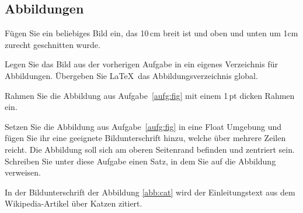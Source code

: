 \subsection{Abbildungen}						%
\pagecolor{white}
\begin{aufgabe}\label{aufg:fig} \label{aufg:22}
F\"ugen Sie ein beliebiges Bild ein, das 10\,cm breit ist und oben und unten um 1cm zurecht geschnitten wurde. 
\end{aufgabe}


\begin{aufgabe}
\label{aufg:23}
Legen Sie das Bild aus der vorherigen Aufgabe in ein eigenes Verzeichnis f\"ur Abbildungen. \"Ubergeben Sie \LaTeX\ das Abbildungsverzeichnis global.	
\end{aufgabe}

\begin{aufgabe}
\label{aufg:24}
Rahmen Sie die Abbildung aus Aufgabe~\ref{aufg:fig} mit einem 1\,pt dicken Rahmen ein.
\end{aufgabe}

\begin{aufgabe}
\label{aufg:25}
Setzen Sie die Abbildung aus Aufgabe~\ref{aufg:fig} in eine Float Umgebung und f\"ugen Sie ihr eine geeignete Bildunterschrift hinzu, welche \"uber mehrere Zeilen reicht. Die Abbildung soll sich am oberen Seitenrand befinden und zentriert sein. Schreiben Sie unter diese Aufgabe einen Satz, in dem Sie auf die Abbildung verweisen.	
\end{aufgabe}
\FloatBarrier			%
In der Bildunterschrift der Abbildung \ref{abb:cat} wird der Einleitungstext aus dem Wikipedia-Artikel über Katzen zitiert.

